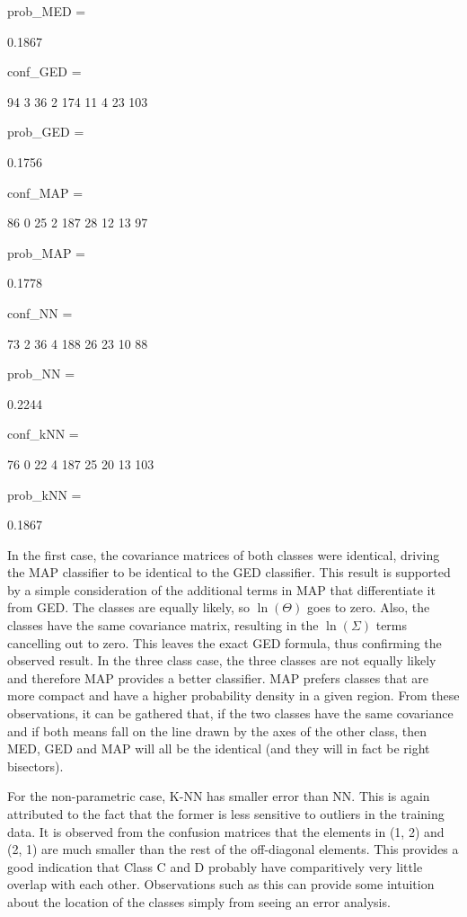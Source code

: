 prob_MED =

    0.1867


conf_GED =

    94     3    36
     2   174    11
     4    23   103


prob_GED =

    0.1756


conf_MAP =

    86     0    25
     2   187    28
    12    13    97


prob_MAP =

    0.1778


conf_NN =

    73     2    36
     4   188    26
    23    10    88


prob_NN =

    0.2244


conf_kNN =

    76     0    22
     4   187    25
    20    13   103


prob_kNN =

    0.1867

In the first case, the covariance matrices of both classes were identical,
driving the MAP classifier to be identical to the GED classifier.  This result
is supported by a simple consideration of the additional terms in MAP that 
differentiate it from GED.  The classes are equally likely, so $\ln(\Theta)$
goes to zero.  Also, the classes have the same covariance matrix, resulting in the
$\ln(\Sigma)$ terms cancelling out to zero.  This leaves the exact GED
formula, thus confirming the observed result.  In the three class case, the three
classes are not equally likely and therefore MAP provides a better classifier. 
MAP prefers classes that are more compact and have a higher probability density
in a given region. From these observations, it can be gathered that, if the two
classes have the same covariance and if both means fall on the line drawn by
the  axes of the other class, then MED, GED and MAP will all be the identical 
(and they will in fact be right bisectors).

For the non-parametric case, K-NN has smaller error than NN. This is again
attributed to the fact that the former is less sensitive to outliers in the 
training data. It is observed from the confusion matrices that the elements in
(1, 2) and (2, 1) are much smaller than the rest of the off-diagonal elements. 
This provides a good indication that Class C and D probably have comparitively 
very little overlap with each other.  Observations such as this can provide
some intuition about the location of the classes simply from seeing an error analysis.

